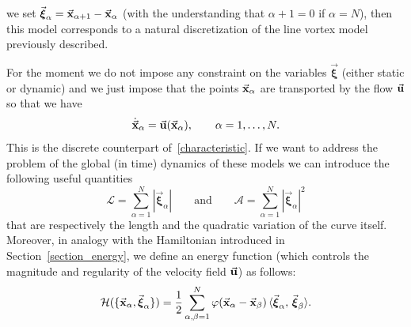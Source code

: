 \documentclass[a4paper,11pt]{article}
\numberwithin{equation}{section}
\newcommand{\la}{\langle}
\newcommand{\ra}{\rangle}
\newcommand{\U}{\mbox{$\vec{\bf u}$}}
\newcommand{\x}{\mbox{$\vec{\bf x}$}}
\newcommand{\bxi}{\mbox{$\vec{\boldsymbol \xi}$}}
\begin{document}
we set $\bxi_\alpha = \x_{\alpha+1} - \x_{\alpha}$ (with the
understanding that $\alpha +1 = 0$ if $\alpha = N$), then this model
corresponds to a natural discretization of the line vortex model
previously described.\par
%
For the moment we do not impose any constraint on the variables $\bxi$
(either static or dynamic) and we just impose that the points
$\x_\alpha$ are transported by the flow $\U$ so that we have
\begin{equation}
  \label{eq:dyn-of-points}%
{\dot{\x}}_\alpha = \U(\x_\alpha), \qquad \alpha=1,\dots,N.
\end{equation}
This is the discrete counterpart of~\eqref{characteristic}. %
If we want to address the problem of the global (in time) dynamics  of
these models we can introduce the following useful quantities
\begin{equation*}
\mathcal{L} = \sum_{\alpha=1}^N |\bxi_\alpha|\qquad\text{and}\qquad
\mathcal{A} = \sum_{\alpha=1}^N |\bxi_\alpha|^2  
\end{equation*}
that are respectively the length and the quadratic variation of the
curve itself.  Moreover, in analogy with the Hamiltonian introduced in
Section~\ref{section_energy}, we define an energy function (which
controls the magnitude and regularity of the velocity field $\U$) as
follows:
\begin{equation*}
\mathcal{H}(\{\x_\alpha, \bxi_\alpha\}) = \frac{1}{2}\sum_{\alpha,\beta=1}^N
\varphi(\x_\alpha-\x_\beta) \,\la\bxi_\alpha,\,\bxi_\beta\ra. 
\end{equation*}
\end{document}
